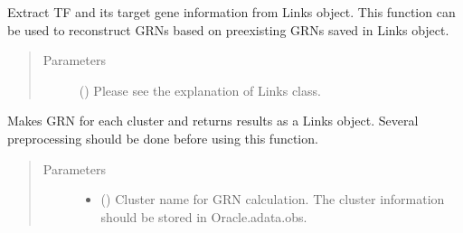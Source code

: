 \documentclass[letterpaper,10pt,english]{sphinxmanual}
\begin{document}
\begin{fulllineitems}
\begin{fulllineitems}
\end{fulllineitems}


\begin{fulllineitems}
\label{\detokenize{modules/celloracle:celloracle.Oracle.get_cluster_specific_TFdict_from_Links}}
Extract TF and its target gene information from Links object.
This function can be used to reconstruct GRNs based on pre\sphinxhyphen{}existing GRNs saved in Links object.
\begin{quote}\begin{description}
\item[{Parameters}] \leavevmode
{} ({\hyperref[\detokenize{modules/celloracle:celloracle.Links}]{}}) \textendash{} Please see the explanation of Links class.

\end{description}\end{quote}

\end{fulllineitems}


\begin{fulllineitems}
\label{\detokenize{modules/celloracle:celloracle.Oracle.get_links}}
Makes GRN for each cluster and returns results as a Links object.
Several preprocessing should be done before using this function.
\begin{quote}\begin{description}
\item[{Parameters}] \leavevmode\begin{itemize}
\item {} 
 () \textendash{} Cluster name for GRN calculation. The cluster information should be stored in Oracle.adata.obs.


\end{itemize}
\end{description}
\end{quote}
\end{fulllineitems}
\end{fulllineitems}
\end{document}
